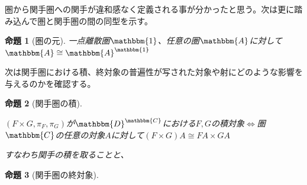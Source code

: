 \documentclass[uplatex,dvipdfmx]{jsarticle}
\newcommand{\cat}[1]{\mathbbm{#1}}
\newcommand{\funccat}[2]{\cat{#2}^\cat{#1}}
\newtheorem{prop}{命題}[section]
\numberwithin{proof}{subsection}
\numberwithin{prop}{subsection}
\numberwithin{define}{subsection}
\begin{document}
  圏から関手圏への関手が違和感なく定義される事が分かったと思う。次は更に踏み込んで圏と関手圏の間の同型を示す。
  \begin{prop}[圏の元]
    一点離散圏$\cat{1}$、任意の圏$\cat{A}$に対して$\cat{A}\cong\funccat{1}{A}$
  \end{prop}

  次は関手圏における積、終対象の普遍性が写された対象や射にどのような影響を与えるのかを確認する。
  \begin{prop}[関手圏の積]
    \begin{center}
      $(F\times G,\pi_F,\pi_G)$が$\funccat{C}{D}$における$F,G$の積対象$\iff$圏$\cat{C}$の任意の対象$A$に対して$(F\times G)A\cong FA\times GA$
    \end{center}
    すなわち関手の積を取ることと、
  \end{prop}
  \begin{prop}[関手圏の終対象]
    
  \end{prop}
  
\end{document}
